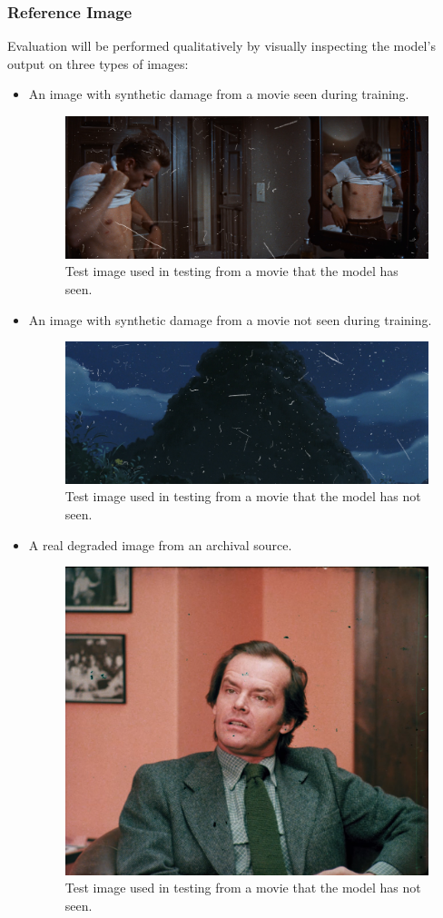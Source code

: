 \documentclass[openany, 12pt]{article}
\begin{document}
\subsubsection*{Reference Image}
Evaluation will be performed qualitatively by visually inspecting the model's output on three types of images:
\begin{itemize}
    \item An image with synthetic damage from a movie seen during training.
    	\begin{figure}[h!]
	\centering
	\includegraphics[width=0.8\linewidth]{./images/rebel_cause_frame_0067.png}
	\caption{\smaller Test image used in testing from a movie that the model has seen. } 
\end{figure}
\newpage
    \item An image with synthetic damage from a movie not seen during training.
    	\begin{figure}[h!]
	\centering
	\includegraphics[width=0.8\linewidth]{./images/totoro_dirty.png}
	\caption{\smaller Test image used in testing from a movie that the model has not seen. } 
\end{figure}
    \item A real degraded image from an archival source.
        	\begin{figure}[h!]
	\centering
	\includegraphics[width=0.5\linewidth]{./images/image(4).png}
	\caption{\smaller Test image used in testing from a movie that the model has not seen. } 
\end{figure}
\end{itemize}
\end{document}

